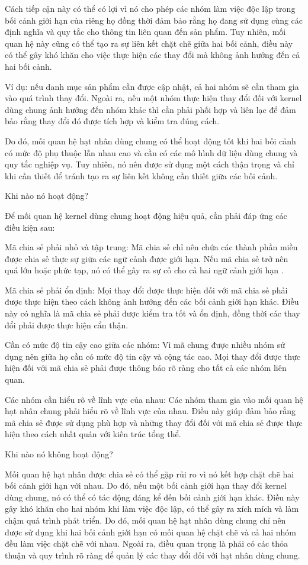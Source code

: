 Cách tiếp cận này có thể có lợi vì nó cho phép các nhóm làm việc độc lập trong bối cảnh giới hạn của riêng họ đồng thời đảm bảo rằng họ đang sử dụng cùng các định nghĩa và quy tắc cho thông tin liên quan đến sản phẩm. Tuy nhiên, mối quan hệ này cũng có thể tạo ra sự liên kết chặt chẽ giữa hai bối cảnh, điều này có thể gây khó khăn cho việc thực hiện các thay đổi mà không ảnh hưởng đến cả hai bối cảnh.

Ví dụ: nếu danh mục sản phẩm cần được cập nhật, cả hai nhóm sẽ cần tham gia vào quá trình thay đổi. Ngoài ra, nếu một nhóm thực hiện thay đổi đối với kernel dùng chung ảnh hưởng đến nhóm khác thì cần phải phối hợp và liên lạc để đảm bảo rằng thay đổi đó được tích hợp và kiểm tra đúng cách.

Do đó, mối quan hệ hạt nhân dùng chung có thể hoạt động tốt khi hai bối cảnh có mức độ phụ thuộc lẫn nhau cao và cần có các mô hình dữ liệu dùng chung và quy tắc nghiệp vụ. Tuy nhiên, nó nên được sử dụng một cách thận trọng và chỉ khi cần thiết để tránh tạo ra sự liên kết không cần thiết giữa các bối cảnh.

Khi nào nó hoạt động?

Để mối quan hệ kernel dùng chung hoạt động hiệu quả, cần phải đáp ứng các điều kiện sau:

Mã chia sẻ phải nhỏ và tập trung: Mã chia sẻ chỉ nên chứa các thành phần miền được chia sẻ thực sự giữa các ngữ cảnh được giới hạn. Nếu mã chia sẻ trở nên quá lớn hoặc phức tạp, nó có thể gây ra sự cố cho cả hai ngữ cảnh giới hạn .

Mã chia sẻ phải ổn định: Mọi thay đổi được thực hiện đối với mã chia sẻ phải được thực hiện theo cách không ảnh hưởng đến các bối cảnh giới hạn khác. Điều này có nghĩa là mã chia sẻ phải được kiểm tra tốt và ổn định, đồng thời các thay đổi phải được thực hiện cẩn thận.

Cần có mức độ tin cậy cao giữa các nhóm: Vì mã chung được nhiều nhóm sử dụng nên giữa họ cần có mức độ tin cậy và cộng tác cao. Mọi thay đổi được thực hiện đối với mã chia sẻ phải được thông báo rõ ràng cho tất cả các nhóm liên quan.

Các nhóm cần hiểu rõ về lĩnh vực của nhau: Các nhóm tham gia vào mối quan hệ hạt nhân chung phải hiểu rõ về lĩnh vực của nhau. Điều này giúp đảm bảo rằng mã chia sẻ được sử dụng phù hợp và những thay đổi đối với mã chia sẻ được thực hiện theo cách nhất quán với kiến trúc tổng thể.

Khi nào nó không hoạt động?

Mối quan hệ hạt nhân được chia sẻ có thể gặp rủi ro vì nó kết hợp chặt chẽ hai bối cảnh giới hạn với nhau. Do đó, nếu một bối cảnh giới hạn thay đổi kernel dùng chung, nó có thể có tác động đáng kể đến bối cảnh giới hạn khác. Điều này gây khó khăn cho hai nhóm khi làm việc độc lập, có thể gây ra xích mích và làm chậm quá trình phát triển. Do đó, mối quan hệ hạt nhân dùng chung chỉ nên được sử dụng khi hai bối cảnh giới hạn có mối quan hệ chặt chẽ và cả hai nhóm đều làm việc chặt chẽ với nhau. Ngoài ra, điều quan trọng là phải có các thỏa thuận và quy trình rõ ràng để quản lý các thay đổi đối với hạt nhân dùng chung.

